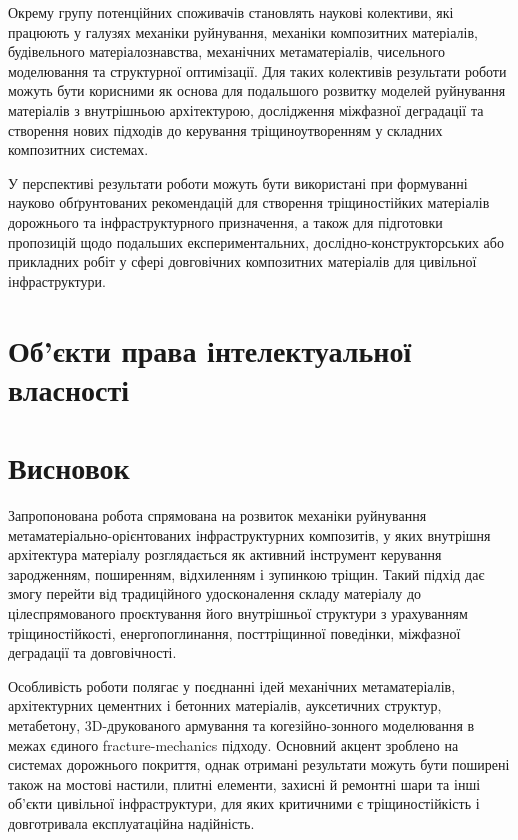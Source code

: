 \documentclass[12pt,a4paper]{article}
\begin{document}
Окрему групу потенційних споживачів становлять наукові колективи, які працюють у галузях механіки руйнування, механіки композитних матеріалів, будівельного матеріалознавства, механічних метаматеріалів, чисельного моделювання та структурної оптимізації. Для таких колективів результати роботи можуть бути корисними як основа для подальшого розвитку моделей руйнування матеріалів з внутрішньою архітектурою, дослідження міжфазної деградації та створення нових підходів до керування тріщиноутворенням у складних композитних системах.

У перспективі результати роботи можуть бути використані при формуванні науково обґрунтованих рекомендацій для створення тріщиностійких матеріалів дорожнього та інфраструктурного призначення, а також для підготовки пропозицій щодо подальших експериментальних, дослідно-конструкторських або прикладних робіт у сфері довговічних композитних матеріалів для цивільної інфраструктури.

\section{Об'єкти права інтелектуальної власності}

\section{Висновок}

Запропонована робота спрямована на розвиток механіки руйнування метаматеріально-орієнтованих інфраструктурних композитів, у яких внутрішня архітектура матеріалу розглядається як активний інструмент керування зародженням, поширенням, відхиленням і зупинкою тріщин. Такий підхід дає змогу перейти від традиційного удосконалення складу матеріалу до цілеспрямованого проєктування його внутрішньої структури з урахуванням тріщиностійкості, енергопоглинання, посттріщинної поведінки, міжфазної деградації та довговічності.

Особливість роботи полягає у поєднанні ідей механічних метаматеріалів, архітектурних цементних і бетонних матеріалів, ауксетичних структур, метабетону, 3D-друкованого армування та когезійно-зонного моделювання в межах єдиного fracture-mechanics підходу. Основний акцент зроблено на системах дорожнього покриття, однак отримані результати можуть бути поширені також на мостові настили, плитні елементи, захисні й ремонтні шари та інші об'єкти цивільної інфраструктури, для яких критичними є тріщиностійкість і довготривала експлуатаційна надійність.
\end{document}

